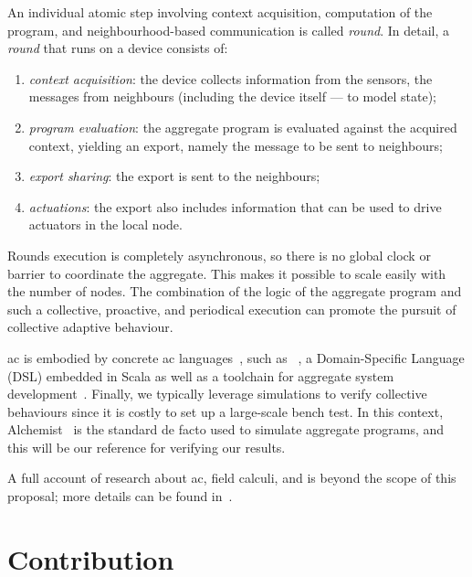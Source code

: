 \documentclass[11pt]{article}
\begin{document}
An individual atomic step involving context acquisition, computation of the program, and neighbourhood-based communication is called \emph{round}.
%
In detail, a \emph{round} that runs on a device consists of:
\begin{enumerate}
  \item \emph{context acquisition}: the device collects information from the sensors, the messages from neighbours (including the device itself --- to model state);
  \item \emph{program evaluation}: the aggregate program is evaluated against the acquired context, yielding an export, namely the message to be sent to neighbours;
  \item \emph{export sharing}: the export is sent to the neighbours;
  \item \emph{actuations}: the export also includes information that can be used to drive actuators in the local node.
\end{enumerate}
%
Rounds execution is completely asynchronous, so there is no global clock or barrier to coordinate the aggregate. 
%
This makes it possible to scale easily with the number of nodes. 
%
The combination of the logic of the aggregate program and such a collective, proactive, and periodical execution can promote the pursuit of collective adaptive behaviour.

\ac{ac} is embodied by concrete \ac{ac} languages~\cite{viroli2019jlamp-si-coord},
 such as \scafi{}~\cite{DBLP:conf/isola/CasadeiVAD20,DBLP:journals/eaai/CasadeiVAPD21},
 a Domain-Specific Language (DSL) embedded in Scala
 as well as a toolchain for aggregate system development~\cite{Casadei2016mass}.
%
Finally, we typically leverage simulations to verify collective behaviours since it is costly to set up a large-scale bench test. 
%
In this context, Alchemist~\cite{Pianini_2013} is the standard de facto used to simulate aggregate programs, and this will be our reference for verifying our results.

A full account of research about \ac{ac}, field calculi, and \scafi{} is beyond the scope of this proposal; more details can be found in~\cite{viroli2019jlamp-si-coord,DBLP:journals/eaai/CasadeiVAPD21}.

\section{Contribution} \label{contribution}
\end{document}
